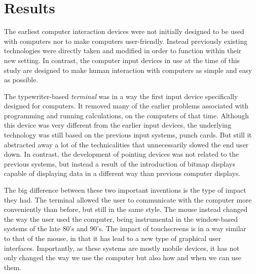 
\section{Results}


The earliest computer interaction devices were not initially designed to be used with computers nor to make computers user-friendly. Instead previously existing technologies were directly taken and modified in order to function within their new setting. In contrast, the computer input devices in use at the time of this study are designed to make human interaction with computers as simple and easy as possible.

The typewriter-based \emph{terminal} was in a way the first input device specifically designed for computers. It removed many of the earlier problems associated with programming and running calculations, on the computers of that time. Although this device was very different from the earlier input devices, the underlying technology was still based on the previous input systems, punch cards. But still it abstracted away a lot of the technicalities that unnecessarily slowed the end user down. In contrast, the development of pointing devices was not related to the previous systems, but instead a result of the introduction of bitmap displays capable of displaying data in a different way than previous computer displays.

The big difference between these two important inventions is the type of impact they had. The terminal allowed the user to communicate with the computer more conveniently than before, but still in the same style. The mouse instead changed the way the user used the computer, being instrumental in the window-based systems of the late 80's and 90's. The impact of touchscreens is in a way similar to that of the mouse, in that it has lead to a new type of graphical user interfaces. Importantly, as these systems are mostly mobile devices, it has not only changed the way we use the computer but also how and when we can use them.


